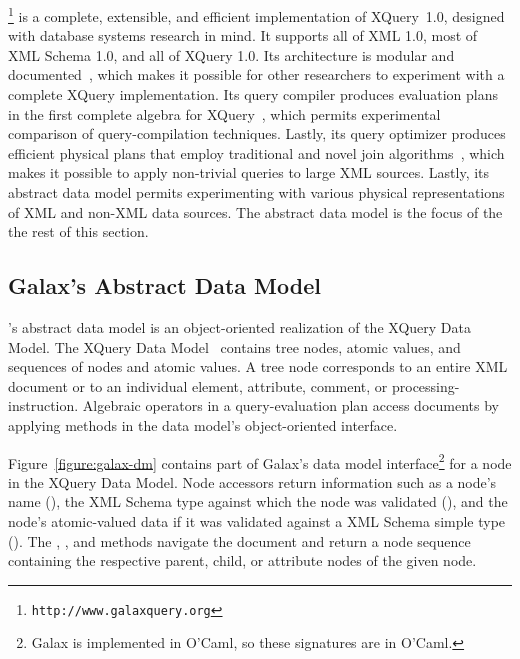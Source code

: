 \Galax{}\footnote{\texttt{http://www.galaxquery.org}} is a complete,
extensible, and efficient implementation of XQuery~1.0, designed with
database systems research in mind.  It supports all of XML 1.0, most
of XML Schema 1.0, and all of XQuery 1.0.  Its architecture is modular
and documented~\cite{galax:edbt2004}, which makes it possible for
other researchers to experiment with a complete XQuery implementation.
Its query compiler produces evaluation plans in the first complete
algebra for XQuery~\cite{galax:icde2006}, which permits experimental
comparison of query-compilation techniques.  Lastly, its query
optimizer produces efficient physical plans that employ traditional
and novel join algorithms~\cite{galax:icde2006}, which makes it
possible to apply non-trivial queries to large XML sources.  Lastly,
its abstract data model permits experimenting with various physical
representations of XML and non-XML data sources.  The abstract data
model is the focus of the the rest of this section.

\subsection{Galax's Abstract Data Model}

\Galax{}'s abstract data model is an object-oriented realization of
the XQuery Data Model.  The XQuery Data Model~\cite{XPath:DataModel}
contains tree nodes, atomic values, and sequences of nodes and atomic
values.  A tree node corresponds to an entire XML document or to an
individual element, attribute, comment, or processing-instruction.
Algebraic operators in a query-evaluation plan access documents by
applying methods in the data model's object-oriented interface.

Figure~\ref{figure:galax-dm} contains part of Galax's data model
interface\footnote{Galax is implemented in O'Caml, so these signatures
are in O'Caml.} for a node in the XQuery Data Model.  Node
accessors return information such as a node's name (),
the XML Schema type against which the node was validated (),
and the node's atomic-valued data if it was validated against a XML
Schema simple type ().  The , ,
and  methods navigate the document and return a node
sequence containing the respective parent, child, or attribute nodes
of the given node.

